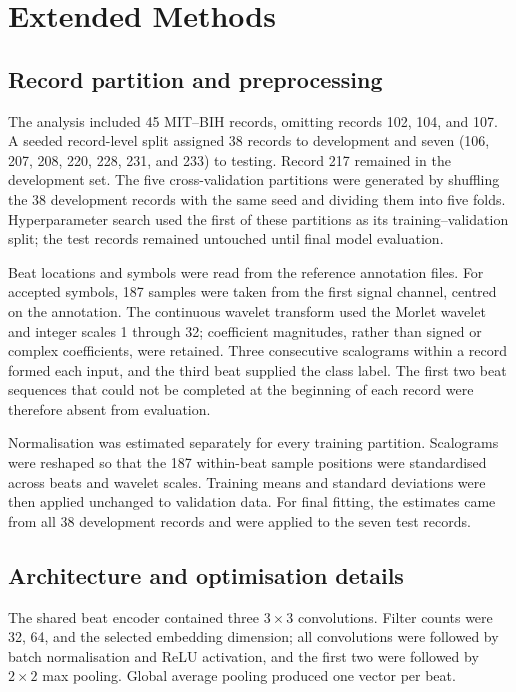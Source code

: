 \section{Extended Methods}

\subsection{Record partition and preprocessing}
The analysis included 45 MIT--BIH records, omitting records 102, 104, and 107. A seeded record-level split assigned 38 records to development and seven (106, 207, 208, 220, 228, 231, and 233) to testing. Record 217 remained in the development set. The five cross-validation partitions were generated by shuffling the 38 development records with the same seed and dividing them into five folds. Hyperparameter search used the first of these partitions as its training--validation split; the test records remained untouched until final model evaluation.

Beat locations and symbols were read from the reference annotation files. For accepted symbols, 187 samples were taken from the first signal channel, centred on the annotation. The continuous wavelet transform used the Morlet wavelet and integer scales 1 through 32; coefficient magnitudes, rather than signed or complex coefficients, were retained. Three consecutive scalograms within a record formed each input, and the third beat supplied the class label. The first two beat sequences that could not be completed at the beginning of each record were therefore absent from evaluation.

Normalisation was estimated separately for every training partition. Scalograms were reshaped so that the 187 within-beat sample positions were standardised across beats and wavelet scales. Training means and standard deviations were then applied unchanged to validation data. For final fitting, the estimates came from all 38 development records and were applied to the seven test records.

\subsection{Architecture and optimisation details}
The shared beat encoder contained three $3\times3$ convolutions. Filter counts were 32, 64, and the selected embedding dimension; all convolutions were followed by batch normalisation and ReLU activation, and the first two were followed by $2\times2$ max pooling. Global average pooling produced one vector per beat.

